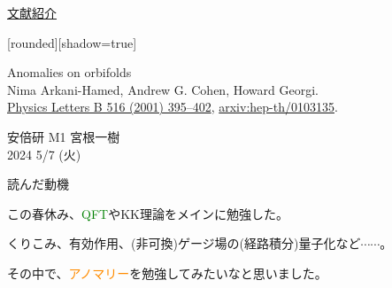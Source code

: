 \documentclass[
  unicode,a4paper,10pt,
  xcolor = {dvipsnames,svgnames},
  hyperref ={colorlinks=true,citecolor=Navy,linkcolor=NavyBlue,urlcolor=purple},
  ja=standard,lualatex
]{beamer}
\begin{document}
\nocite{Arkani-Hamed:2001uol}

\begin{frame}

  \begin{center}
    \uline{文献紹介}
  \end{center}

  [rounded][shadow=true]
  \begin{block}{}
    \vspace*{5pt}

    \centering\Large
    Anomalies on orbifolds
    \\
    \normalsize
    Nima Arkani-Hamed, Andrew G. Cohen, Howard Georgi.
    \\
    \small
    \href{https://doi.org/10.1016/S0370-2693(01)00946-7}{Physics Letters B 516 (2001) 395–402},
    \href{https://doi.org/10.48550/arXiv.hep-th/0103135}{arxiv:hep-th/0103135}.

    \vspace*{5pt}
  \end{block}

  \begin{center}
    安倍研 M1 宮根一樹\\
    2024 5/7 (火)
  \end{center}
\end{frame}


\begin{frame}{読んだ動機}

  この春休み、\textcolor{Green}{QFT}やKK理論をメインに勉強した。

  \vspace*{5pt}
  
  くりこみ、有効作用、(非可換)ゲージ場の(経路積分)量子化など$\cdots\cdots$。

  \vspace*{5pt}
  
  その中で、\textcolor{DarkOrange}{アノマリー}を勉強してみたいなと思いました。

\end{frame}
\end{document}
